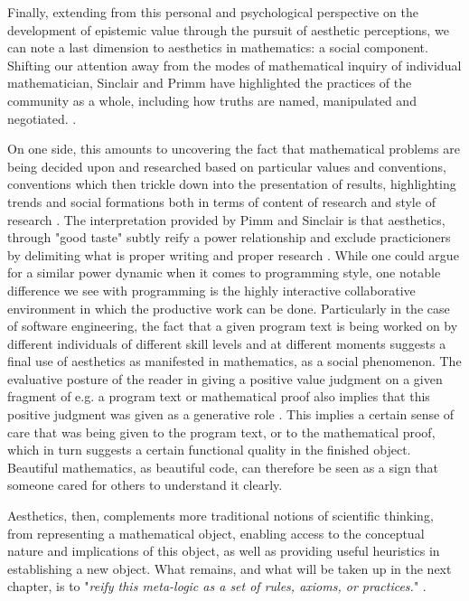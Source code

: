 Finally, extending from this personal and psychological perspective on the development of epistemic value through the pursuit of aesthetic perceptions, we can note a last dimension to aesthetics in mathematics: a social component. Shifting our attention away from the modes of mathematical inquiry of individual mathematician, Sinclair and Primm have highlighted the practices of the community as a whole, including how truths are named, manipulated and negotiated. \citep{sinclair_aesthetic_2011}.

On one side, this amounts to uncovering the fact that mathematical problems are being decided upon and researched based on particular values and conventions, conventions which then trickle down into the presentation of results, highlighting trends and social formations both in terms of content of research and style of research \citep{depaz_stylistique_2023}. The interpretation provided by Pimm and Sinclair is that aesthetics, through "good taste" subtly reify a power relationship and exclude practicioners by delimiting what is proper writing and proper research \citep{sinclair_many_2010}. While one could argue for a similar power dynamic when it comes to programming style, one notable difference we see with programming is the highly interactive collaborative environment in which the productive work can be done. Particularly in the case of software engineering, the fact that a given program text is being worked on by different individuals of different skill levels and at different moments suggests a final use of aesthetics as manifested in mathematics, as a social phenomenon. The evaluative posture of the reader in giving a positive value judgment on a given fragment of e.g. a program text or mathematical proof also implies that this positive judgment was given as a generative role \citep{tomov_role_2016a}. This implies a certain sense of care that was being given to the program text, or to the mathematical proof, which in turn suggests a certain functional quality in the finished object. Beautiful mathematics, as beautiful code, can therefore be seen as a sign that someone cared for others to understand it clearly.

Aesthetics, then, complements more traditional notions of scientific thinking, from representing a mathematical object, enabling access to the conceptual nature and implications of this object, as well as providing useful heuristics in establishing a new object. What remains, and what will be taken up in the next chapter, is to "\emph{reify this meta-logic as a set of rules, axioms, or practices.}" \citep{root-bernstein_aesthetic_2002}.

